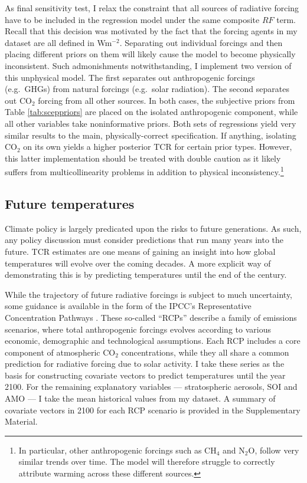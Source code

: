 \documentclass[smallextended]{svjour3}       %
\begin{document}
As final sensitivity test, I relax the constraint that all sources of
radiative forcing have to be included in the regression model under the
same composite \(RF\) term. Recall that this decision was motivated by
the fact that the forcing agents in my dataset are all defined in
Wm\(^{-2}\). Separating out individual forcings and then placing
different priors on them will likely cause the model to become
physically inconsistent. Such admonishments notwithstanding, I implement
two version of this unphysical model. The first separates out
anthropogenic forcings (e.g.~GHGs) from natural forcings (e.g.~solar
radiation). The second separates out CO\(_2\) forcing from all other
sources. In both cases, the subjective priors from Table
\ref{tab:sceppriors} are placed on the isolated anthropogenic component,
while all other variables take noninformative priors. Both sets of
regressions yield very similar results to the main, physically-correct
specification. If anything, isolating CO\(_2\) on its own yields a
higher posterior TCR for certain prior types. However, this latter
implementation should be treated with double caution as it likely
suffers from multicollinearity problems in addition to physical
inconsistency.\footnote{In particular, other anthropogenic forcings such
  as CH\(_4\) and N\(_2\)O, follow very similar trends over time. The
  model will therefore struggle to correctly attribute warming across
  these different sources.}

\hypertarget{sec:future}{%
\subsection{Future temperatures}\label{sec:future}}

Climate policy is largely predicated upon the risks to future
generations. As such, any policy discussion must consider predictions
that run many years into the future. TCR estimates are one means of
gaining an insight into how global temperatures will evolve over the
coming decades. A more explicit way of demonstrating this is by
predicting temperatures until the end of the century.

While the trajectory of future radiative forcings is subject to much
uncertainty, some guidance is available in the form of the IPCC's
Representative Concentration Pathways \cite{van2011rcp}. These so-called
``RCPs'' describe a family of emissions scenarios, where total
anthropogenic forcings evolves according to various economic,
demographic and technological assumptions. Each RCP includes a core
component of atmospheric CO\(_2\) concentrations, while they all share a
common prediction for radiative forcing due to solar activity. I take
these series as the basis for constructing covariate vectors to predict
temperatures until the year 2100. For the remaining explanatory
variables --- stratospheric aerosols, SOI and AMO --- I take the mean
historical values from my dataset. A summary of covariate vectors in
2100 for each RCP scenario is provided in the Supplementary Material.
\end{document}

